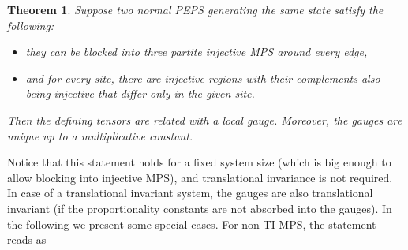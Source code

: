 \documentclass[preprint, superscriptaddress,a4paper,longbibliography]{revtex4-1}
\newtheorem{theorem}{Theorem}
\theoremstyle{definition}
\begin{document}
\begin{theorem}\label{thm:normal}
    Suppose two normal PEPS generating the same state satisfy the following:
    \begin{itemize}
        \item they can be blocked into three partite injective MPS around every edge,
        \item and for every site, there are injective regions with their complements also being injective that differ only in the given site.
    \end{itemize}
    Then the defining tensors are related with a local gauge. Moreover, the gauges are unique up to a multiplicative constant.
\end{theorem}
Notice that this statement holds for a fixed system size (which is big enough to allow blocking into injective MPS), and translational invariance is not required. In case of a translational invariant system, the gauges are also translational invariant (if the proportionality constants are not absorbed into the gauges). In the following we present some special cases. For non TI MPS, the statement reads as
\end{document}
